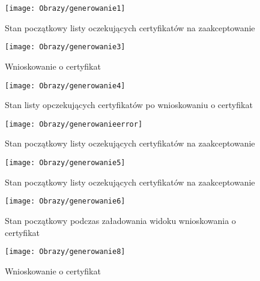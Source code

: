 \begin{enumerate*}
	
	
		\begin{figure}[ht!]
		
		\begin{minipage}{0.2\textwidth}
			\texttt{[image: Obrazy/generowanie1]}
			\caption{Stan początkowy listy oczekujących certyfikatów na zaakceptowanie }
			\label{rys:generowanie1}
		\end{minipage}
	
		
		\begin{minipage}{0.2\textwidth}
			\texttt{[image: Obrazy/generowanie3]}
			\caption{Wnioskowanie o certyfikat}
			\label{rys:generowanie2}
		\end{minipage}
		\begin{minipage}{0.2\textwidth}
			\texttt{[image: Obrazy/generowanie4]}
			\caption{Stan listy opczekujących certyfikatów po wnioskowaniu o certyfikat}
			\label{rys:generowanie3}
		\end{minipage}
	\end{figure}


	


	\begin{figure}[ht!]
	
		\begin{minipage}{0.2\textwidth}
		\texttt{[image: Obrazy/generowanieerror]}
		\caption{Stan początkowy listy oczekujących certyfikatów na zaakceptowanie }
		\label{rys:generowanie4}
	\end{minipage}
	
		\begin{minipage}{0.2\textwidth}
		\texttt{[image: Obrazy/generowanie5]}
		\caption{Stan początkowy listy oczekujących certyfikatów na zaakceptowanie }
		\label{rys:generowanie5}
	\end{minipage}
	

	\begin{minipage}{0.2\textwidth}
		\texttt{[image: Obrazy/generowanie6]}
		\caption{Stan początkowy podczas załadowania widoku wnioskowania o certyfikat}
		\label{rys:generowanie6}
	\end{minipage}
	
	\begin{minipage}{0.2\textwidth}
		\texttt{[image: Obrazy/generowanie8]}
		\caption{Wnioskowanie o certyfikat}
		\label{rys:generowanie7}
	\end{minipage}


\end{figure}
\end{enumerate*}
